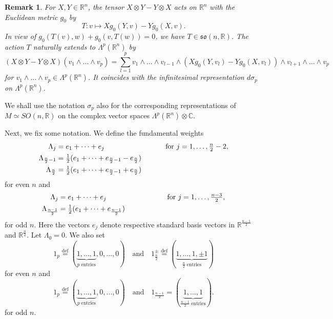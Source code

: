 \documentclass[a4paper,12pt,reqno]{amsart}
\newtheorem{bem}[theorem]{Remark}
\numberwithin{theorem}{subsection}
\numberwithin{equation}{section}
\begin{document}
\begin{bem}\label{AlgebraicAction} For $X, Y \in {\mathbb{R}}^n$, the tensor
$X \otimes Y-Y \otimes X$ acts on ${\mathbb{R}}^n$ with the Euclidean metric $g_0$ by
$$
   T: v \mapsto X g_0(Y,v) - Y g_0(X,v).
$$
In view of $g_0(T(v),w) + g_0(v,T(w))=0$, we have $T \in \mathfrak{so}(n,{\mathbb{R}})$.
The action $T$ naturally extends to $\Lambda^p({\mathbb{R}}^n)$ by
$$
   (X \otimes Y-Y \otimes X)(v_1 \wedge \dots \wedge v_p)
   = \sum_{l=1}^p v_1\wedge \dots \wedge v_{l-1} \wedge (X g_0(Y,v_l) - Y g_0(X,v_l)) \wedge
   v_{l+1}\wedge \dots \wedge v_p
$$
for $v_1\wedge \dots \wedge v_p \in \Lambda^p({\mathbb{R}}^n)$. It coincides with the
infinitesimal representation ${d}\sigma_p$ on $\Lambda^p({\mathbb{R}}^n)$.
\end{bem}

We shall use the notation $\sigma_p$ also for the corresponding representations
of $M \simeq SO(n,{\mathbb{R}})$ on the complex vector spaces $\Lambda^p({\mathbb{R}}^{n}) \otimes
{\mathbb{C}}$.

Next, we fix some notation. We define the fundamental weights
\begin{align}\label{fund-w-even}
   \Lambda_j & = e_1 + \dots + e_j \hspace{3cm} \mbox{for $j=1,\dots,\tfrac{n}{2}-2$}, \notag \\
   \Lambda_{\frac{n}{2}-1} & = \tfrac{1}{2} (e_1 + \dots + e_{\frac{n}{2}-1} - e_{\frac{n}{2}}) \notag \\
   \Lambda_{\frac{n}{2}} & = \tfrac{1}{2} (e_1 + \dots + e_{\frac{n}{2}-1} + e_{\frac{n}{2}})
\end{align}
for even $n$ and
\begin{align}\label{fund-w-odd}
   \Lambda_j & = e_1 + \dots + e_j \hspace{3cm} \mbox{for $j=1,\dots,\tfrac{n-3}{2}$}, \notag\\
   \Lambda_{\frac{n-1}{2}} & = \tfrac{1}{2} (e_1 + \dots + e_{\frac{n-1}{2}})
\end{align}
for odd $n$. Here the vectors $e_j$ denote respective standard basis vectors in
${\mathbb{R}}^{\frac{n-1}{2}}$ and ${\mathbb{R}}^{\frac{n}{2}}$. Let $\Lambda_0 = 0$. We also set
\begin{equation*}
   1_p {\stackrel{\text{def}}{=}} (\underbrace{1,\dots,1}_{p \; \text{entries}},0,\dots,0) \quad
   \mbox{and} \quad 1_{\frac{n}{2}}^\pm {\stackrel{\text{def}}{=}} (\underbrace{1,\dots,1,\pm 1}_{\frac{n}{2} \; \text{entries}})
\end{equation*}
for even $n$ and
\begin{equation*}
   1_p {\stackrel{\text{def}}{=}} (\underbrace{1,\dots,1}_{p \; \text{entries}},0,\dots,0) \quad
   \mbox{and} \quad
   1_{\frac{n-1}{2}} = (\underbrace{1,\dots,1}_{\frac{n-1}{2} \; \text{entries}}).
\end{equation*}
for odd $n$.
\end{document}
